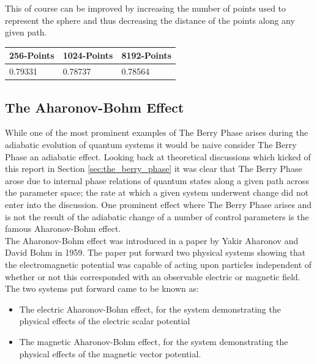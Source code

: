 \documentclass{article}
\begin{document}
This of course can be improved by increasing the number of points used to represent the sphere and thus decreasing the distance of the points along any given path.

\begin{tabular}{||l|l|l||}
  \hline
  \textbf{256-Points} & \textbf{1024-Points} & \textbf{8192-Points}\\
  \hline
  0.79331 & 0.78737 & 0.78564\\
  \hline
\end{tabular}

\subsection{The Aharonov-Bohm Effect}\label{ssec:aharonov_bohm_effect}

While one of the most prominent examples of The Berry Phase arises during the adiabatic evolution of quantum systems it would be naive consider The Berry Phase an adiabatic effect. Looking back at theoretical discussions which kicked of this report in Section \ref{sec:the_berry_phase} it was clear that The Berry Phase arose due to internal phase relations of quantum states along a given path across the parameter space; the rate at which a given system underwent change did not enter into the discussion. One prominent effect where The Berry Phase arises and is not the result of the adiabatic change of a number of control parameters is the famous Aharonov-Bohm effect.\\

The Aharonov-Bohm effect was introduced in a paper by Yakir Aharonov and David Bohm in 1959. The paper put forward two physical systems showing that the electromagnetic potential was capable of acting upon particles independent of whether or not this corresponded with an observable electric or magnetic field. The two systems put forward came to be known as:

\begin{itemize}
  \item The electric Aharonov-Bohm effect, for the system demonstrating the physical effects of the electric scalar potential
  \item The magnetic Aharonov-Bohm effect, for the system demonstrating the physical effects of the magnetic vector potential.
\end{itemize}
\end{document}

